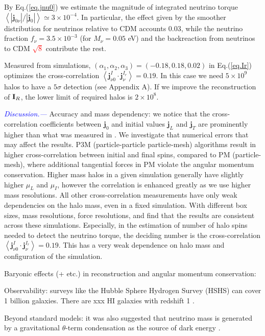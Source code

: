 \documentclass[aps,prd,twocolumn,amsmath,amssymb,amsfont,superscriptaddress]{revtex4-1}
\newcommand{\bs}{\boldsymbol}
\newcommand{\I}{\bold{I}}
\newcommand{\spin}{\bs{j}}
\newcommand{\tcb}{\textcolor{blue}}
\newcommand{\tcr}{\textcolor{red}}
\begin{document}
By Eq.(\ref{eq.jnu0}) we estimate the magnitude of integrated neutrino torque $\left\langle|\spin_{0\nu}|/|\spin_0|\right\rangle\simeq 3\times10^{-4}$. In particular, the effect given by the smoother distribution for neutrinos relative to CDM accounts 0.03, while the neutrino fraction $f_\nu=3.5\times 10^{-3}$ (for $M_\nu=0.05$ eV) and the backreaction from neutrinos to CDM \tcr{$\sqrt{8}$} contribute the rest.

Measured from simulations, $(\alpha_1,\alpha_2,\alpha_3)=(-0.18,0.18,0.02)$ in Eq.(\ref{eq.Ir}) optimizes the cross-correlation $\left\langle\spin^I_{\nu 0}\cdot\spin^{I_r}_\nu\right\rangle=0.19$. In this case we need $5\times 10^9$ halos to have a $5\sigma$ detection (see Appendix A). If we improve the reconstruction of $\I_R$, the lower limit of required halos is $2\times 10^8$. 

\tcb{\textit{Discussion.---}} 
Accuracy and mass dependency: we notice that the cross-correlation coefficients between $\spin_0$ and initial values $\spin_L$ and $\spin_T$ are prominently higher than what was measured in \citep{2000ApJ...532L...5L}. We investigate that numerical errors that may affect the results. P3M (particle-particle particle-mesh) algorithms result in higher cross-correlation between initial and final spins, compared to PM (particle-mesh), where additional tangential forces in PM violate the angular momentum conservation. Higher mass halos in a given simulation generally have slightly higher $\mu_L$ and $\mu_I$, however the correlation is enhanced greatly as we use higher mass resolutions. All other cross-correlation measurements have only weak dependencies on the halo mass, even in a fixed simulation. With different box sizes, mass resolutions, force resolutions, and find that the results are consistent across these simulations. Especially, in the estimation of number of halo spins needed to detect the neutrino torque, the deciding number is the cross-correlation $\left\langle\spin^I_{\nu 0}\cdot\spin^{I_r}_\nu\right\rangle=0.19$. This has a very weak dependence on halo mass and configuration of the simulation.

Baryonic effects (+ etc.) in reconstruction and angular momentum conservation:

Observability: surveys like the Hubble Sphere Hydrogen Survey (HSHS) \citep{2006astro.ph..6104P} can cover 1 billion galaxies. There are xxx HI galaxies with redshift 1 \citep{2004MNRAS.350.1210Z}.

Beyond standard models: it was also suggested that neutrino mass is generated by a gravitational $\theta$-term condensation as the source of dark energy \citep{2016PhRvD..93k3002D}.
\end{document}
